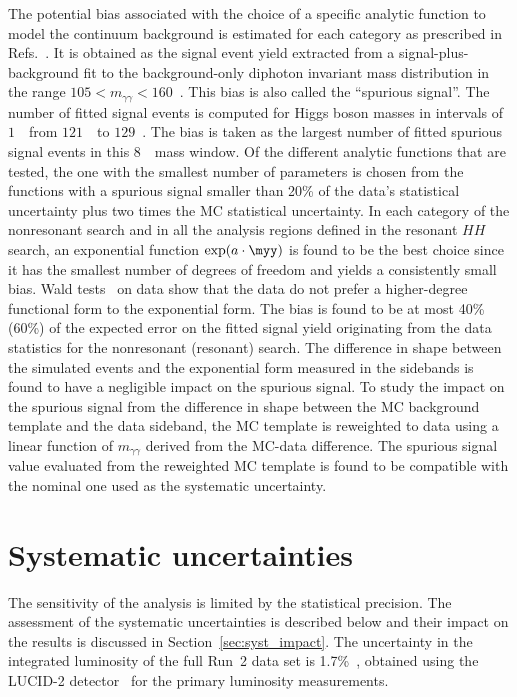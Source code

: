 \documentclass[PAPER, cernpreprint, texlive=2016, paper=a4, USenglish, texmf]{atlasdoc}
\begin{document}
The potential bias associated with the choice of a specific analytic function to model the continuum background is estimated for each category as prescribed in Refs.~\cite{HIGG-2013-08,ATL-PHYS-PUB-2020-028}. It is obtained as the signal event yield extracted from a signal-plus-background fit to the background-only diphoton invariant mass distribution in the range $105 < m_{\gamma\gamma} < 160$~\GeV. This bias is also called the ``spurious signal''.
The number of fitted signal events is computed for Higgs boson masses in intervals of $1$~\GeV\ from $121$~\GeV\ to $129$~\GeV. The bias is taken as the largest number of fitted spurious signal events in this $8$~\GeV\ mass window.
Of the different analytic functions that are tested, the one with the smallest number of parameters is chosen from the functions with a spurious signal smaller than 20\% of the data's statistical uncertainty plus two times the MC statistical uncertainty.
In each category of the nonresonant search and in all the analysis regions defined in the resonant $HH$ search, an exponential function $\exp(a\cdot \myy)$ is found to be the best choice since it has the smallest number of degrees of freedom and yields a consistently small bias.
Wald tests~\cite{Wald:1945} on data show that the data do not prefer a higher-degree functional form to the exponential form. The bias is found to be at most 40\% (60\%) of the expected error on the fitted signal yield originating from the data statistics for the nonresonant (resonant) search. The difference in shape between the simulated events and the exponential form measured in the sidebands is found to have a negligible impact on the spurious signal. 
To study the impact on the spurious signal from the difference in shape between the MC background template and the data sideband, the MC template is reweighted to data using a linear function of $m_{\gamma\gamma}$ derived from the MC-data difference. The spurious signal value evaluated from the reweighted MC template is found to be compatible with the nominal one used as the systematic uncertainty.
 
\section{Systematic uncertainties}
\label{sec:systematics}
The sensitivity of the analysis is limited by the statistical precision. The assessment of the systematic uncertainties is described below and their impact on the results is discussed in Section~\ref{sec:syst_impact}. The uncertainty in the integrated luminosity of the full Run~2 data set is 1.7\%~\cite{ATLAS-CONF-2019-021}, obtained using the LUCID-2 detector~\cite{LUCID2} for the primary luminosity measurements.
 
\end{document}
